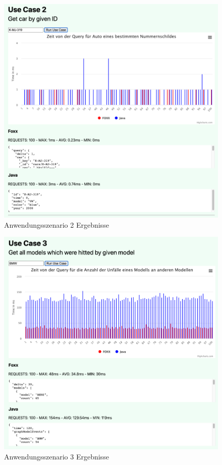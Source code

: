 \begin{figure}[htbp] 
  	\centering
     \includegraphics[width=1\textwidth]{./images/UseCase2.png}
 	\caption{Anwendungsszenario 2 Ergebnisse}
  \label{fig:DataSchema}
\end{figure}
\begin{figure}[htbp] 
  	\centering
     \includegraphics[width=1\textwidth]{./images/UseCase3.png}
 	\caption{Anwendungsszenario 3 Ergebnisse}
  \label{fig:DataSchema}
\end{figure}